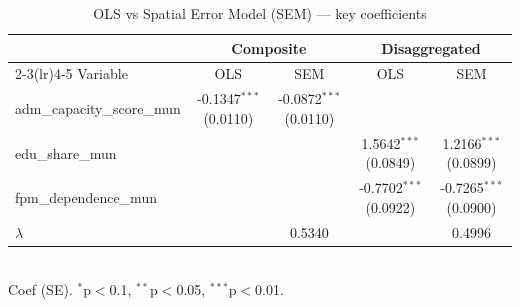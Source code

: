 \begin{table}[h]
\centering
\caption{OLS vs Spatial Error Model (SEM) — key coefficients}
\begin{tabular}{lcccc}
\toprule
 & \multicolumn{2}{c}{Composite} & \multicolumn{2}{c}{Disaggregated} \\
\cmidrule(lr){2-3}\cmidrule(lr){4-5}
Variable & OLS & SEM & OLS & SEM \\
\midrule
adm\_capacity\_score\_mun & -0.1347$^{***}$ (0.0110) & -0.0872$^{***}$ (0.0110) & & \\
edu\_share\_mun & & & 1.5642$^{***}$ (0.0849) & 1.2166$^{***}$ (0.0899) \\
fpm\_dependence\_mun & & & -0.7702$^{***}$ (0.0922) & -0.7265$^{***}$ (0.0900) \\
\midrule
$\lambda$ & & 0.5340 & & 0.4996 \\
\bottomrule
\end{tabular}
\\[4pt]
\footnotesize{Coef (SE). $^{*}$p$<$0.1, $^{**}$p$<$0.05, $^{***}$p$<$0.01.}
\end{table}
